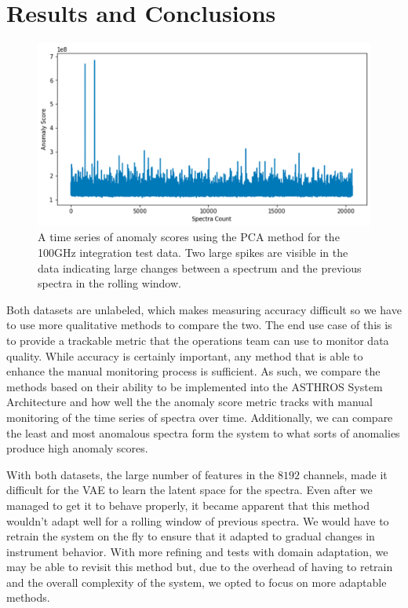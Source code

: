 \section{Results and Conclusions}
\label{chap3/sec:results}
\begin{figure}[b]
    \centering
    \includegraphics[width=0.5\linewidth]{figs/3/asthros_timeseries.png}
    \caption{A time series of anomaly scores using the PCA method for the 100GHz integration test data. Two large spikes are visible in the data indicating large changes between a spectrum and the previous spectra in the rolling window.}
    \label{chap3/fig:timeseries}
\end{figure}

Both datasets are unlabeled, which makes measuring accuracy difficult so we have to use more qualitative methods to compare the two.
The end use case of this is to provide a trackable metric that the operations team can use to monitor data quality.
While accuracy is certainly important, any method that is able to enhance the manual monitoring process is sufficient. 
As such, we compare the methods based on their ability to be implemented into the ASTHROS System Architecture and how well the the anomaly score metric tracks with manual monitoring of the time series of spectra over time. 
Additionally, we can compare the least and most anomalous spectra form the system to what sorts of anomalies produce high anomaly scores. 

With both datasets, the large number of features in the $8192$ channels, made it difficult for the VAE to learn the latent space for the spectra. 
Even after we managed to get it to behave properly, it became apparent that this method wouldn't adapt well for a rolling window of previous spectra. 
We would have to retrain the system on the fly to ensure that it adapted to gradual changes in instrument behavior.
With more refining and tests with domain adaptation, we may be able to revisit this method but, due to the overhead of having to retrain and the overall complexity of the system, we opted to focus on more adaptable methods. 


